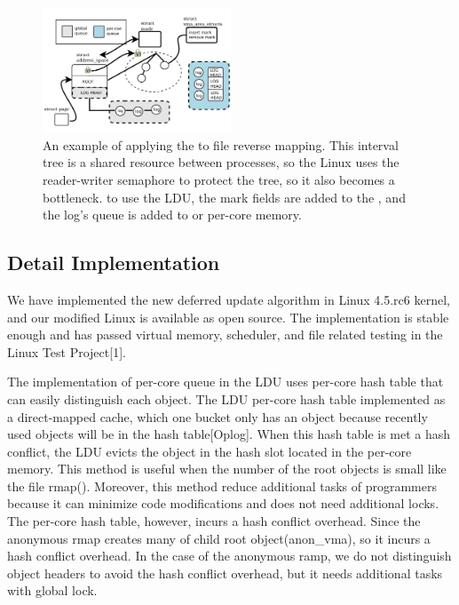 \begin{figure}[tb]
  \begin{center}
     \includegraphics[width=0.5\textwidth,height=0.5\textheight,keepaspectratio]{fig/file_rmap}
  \end{center}
  \caption{An example of applying the  to file reverse mapping. This
   interval tree is a shared resource between processes, so the Linux uses the 
   reader-writer semaphore to protect the tree, so it also becomes a bottleneck.
   to use the LDU, the mark fields are added to the , and the log's queue is added to  or per-core memory.
}
  \label{fig:fileramp}
\end{figure}

\subsection{Detail Implementation}\label{sec:implementation}

We have implemented the new deferred update algorithm in Linux 4.5.rc6 kernel,
and our modified Linux is available as open source. 
The implementation is stable enough and has passed virtual memory, scheduler,
and file related testing in the Linux Test Project[1].

The implementation of per-core queue in the LDU uses per-core hash table that 
can easily distinguish each object.
The LDU per-core hash table implemented as a direct-mapped cache, which one
bucket only has an object because recently used objects will be in the hash
table[Oplog].
When this hash table is met a hash conflict, the LDU evicts the object in the
hash slot located in the per-core memory.
This method is useful when the number of the root objects is small like the file
rmap().
Moreover, this method reduce additional tasks of programmers because it can
minimize code modifications and does not need additional locks.
The per-core hash table, however, incurs a hash conflict overhead.
Since the anonymous rmap creates many of child root object(anon\_vma), so it
incurs a hash conflict overhead.
In the case of the anonymous ramp, we do not distinguish object headers to
avoid the hash conflict overhead, but it needs additional tasks with global
lock.
